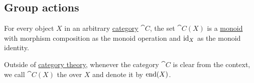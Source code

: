 \subsection{Group actions}\label{subsec:group_actions}

\begin{definition}\label{def:endomorphism_monoid}
  For every object \( X \) in an arbitrary \hyperref[def:category]{category} \( \cat{C} \), the set \( \cat{C}(X) \) is a \hyperref[def:unital_magma/monoid]{monoid} with morphism composition as the monoid operation and \( \operatorname{id}_X \) as the monoid identity.

  Outside of \hyperref[sec:category_theory]{category theory}, whenever the category \( \cat{C} \) is clear from the context, we call \( \cat{C}(X) \) the  over \( X \) and denote it by \( \operatorname{end}(X) \).
\end{definition}

